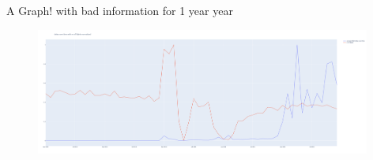 \documentclass[10pt]{beamer}
\begin{document}
\begin{frame}{A Graph! with bad information for 1 year year}
\begin{figure}
    \centering
    \includegraphics[width=11cm]{images/2018-2022bad.png}
    \label{fig:my_label}
\end{figure}
\end{frame}





%  
%  

\end{document}
